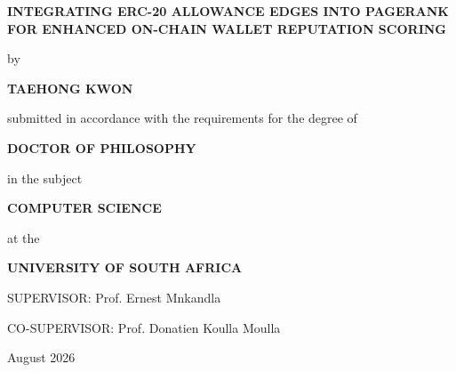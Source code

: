 \begin{titlepage}
\centering
\vspace*{0.4cm}
{\Large\bfseries INTEGRATING ERC-20 ALLOWANCE EDGES INTO PAGERANK FOR ENHANCED ON-CHAIN WALLET REPUTATION SCORING\par}
\vfill
{by\par}
\vspace{0.7cm}
{\large\bfseries TAEHONG KWON\par}
\vfill
{submitted in accordance with the requirements for the degree of\par}
\vspace{0.7cm}
{\large\bfseries DOCTOR OF PHILOSOPHY\par}
\vspace{0.35cm}
{in the subject\par}
\vspace{0.7cm}
{\large\bfseries COMPUTER SCIENCE\par}
\vfill
{at the\par}
\vspace{0.7cm}
{\large\bfseries UNIVERSITY OF SOUTH AFRICA\par}
\vfill
{SUPERVISOR: Prof. Ernest Mnkandla\par}
\vspace{0.35cm}
{CO-SUPERVISOR: Prof. Donatien Koulla Moulla\par}
\vfill
{August 2026\par}
\end{titlepage}
\restoregeometry
